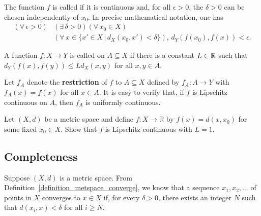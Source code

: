 \begin{definition}
The function $f$ is called  if it is continuous and, for all $\epsilon > 0$, the $\delta >0$ can be chosen independently of $x_0$.
In precise mathematical notation, one has
\begin{equation*}
\begin{split}
(\forall \, \epsilon >0)  & ( \exists \, \delta >0) (\forall \, x_0 \in X) \\ & (\forall \, x \in \{x'\in X\,|\,d_X (x_0,x')<\delta\}), \,
  d_Y \left( f(x_0),f(x) \right) < \epsilon .
\end{split}
\end{equation*}
\end{definition}

\begin{definition}
A function $f  \colon X \rightarrow Y$ is called  on $A \subseteq X$ if there is a constant $L \in \mathbb{R}$ such that $d_Y (f(x),f(y)) \leq L d_X (x,y)$ for all $x,y\in A$.
\end{definition}

Let $f_A$ denote the \textbf{restriction} of $f$ to $A\subseteq X$ defined by $f_A \colon A \to Y$ with $f_A (x) = f(x)$ for all $x\in A$.
It is easy to verify that, if $f$ is Lipschitz continuous on $A$, then $f_A$ is uniformly continuous.

\begin{problem}
Let $(X,d)$ be a metric space and define $f: X \to \mathbb{R}$ by $f(x)=d(x,x_0)$ for some fixed $x_0 \in X$.
Show that $f$ is Lipschitz continuous with $L=1$.
\end{problem}


\subsection{Completeness}
\label{sec:metspace_complete}
Suppose $(X,d)$ is a metric space.
From Definition~\ref{definition_metspace_converge}, we know that a sequence $x_1, x_2, \ldots$ of points in $X$ converges to $x \in X$ if, for every $\delta >0$, there exists an integer $N$ such that $d(x_i,x)<\delta$ for all $i \geq N$.

